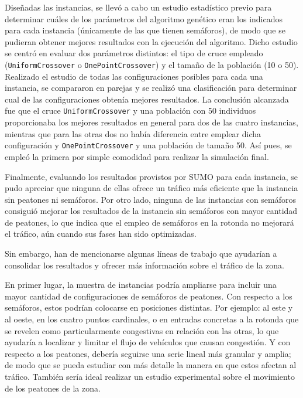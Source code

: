 Diseñadas las instancias, se llevó a cabo un estudio estadístico previo para determinar cuáles de los parámetros del algoritmo genético eran los indicados para cada instancia (únicamente de las que tienen semáforos), de modo que se pudieran obtener mejores resultados con la ejecución del algoritmo. Dicho estudio se centró en evaluar dos parámetros distintos: el tipo de cruce empleado (\texttt{UniformCrossover} o \texttt{OnePointCrossover}) y el tamaño de la población (10 o 50). Realizado el estudio de todas las configuraciones posibles para cada una instancia, se compararon en parejas y se realizó una clasificación para determinar cual de las configuraciones obtenía mejores resultados. La conclusión alcanzada fue que el cruce \texttt{UniformCrossover} y una población con 50 individuos proporcionaba los mejores resultados en general para dos de las cuatro instancias, mientras que para las otras dos no había diferencia entre emplear dicha configuración y \texttt{OnePointCrossover} y una población de tamaño 50. Así pues, se empleó la primera por simple comodidad para realizar la simulación final.

Finalmente, evaluando los resultados provistos por SUMO para cada instancia, se pudo apreciar que ninguna de ellas ofrece un tráfico más eficiente que la instancia sin peatones ni semáforos. Por otro lado, ninguna de las instancias con semáforos consiguió mejorar los resultados de la instancia sin semáforos con mayor cantidad de peatones, lo que indica que el empleo de semáforos en la rotonda no mejorará el tráfico, aún cuando sus fases han sido optimizadas.

Sin embargo, han de mencionarse algunas líneas de trabajo que ayudarían a consolidar los resultados y ofrecer más información sobre el tráfico de la zona.

En primer lugar, la muestra de instancias podría ampliarse para incluir una mayor cantidad de configuraciones de semáforos de peatones. Con respecto a los semáforos, estos podrían colocarse en posiciones distintas. Por ejemplo: al este y al oeste, en los cuatro puntos cardinales, o en entradas concretas a la rotonda que se revelen como particularmente congestivas en relación con las otras, lo que ayudaría a localizar y limitar el flujo de vehículos que causan congestión. Y con respecto a los peatones, debería seguirse una serie lineal más granular y amplia; de modo que se pueda estudiar con más detalle la manera en que estos afectan al tráfico. También sería ideal realizar un estudio experimental sobre el movimiento de los peatones de la zona.

